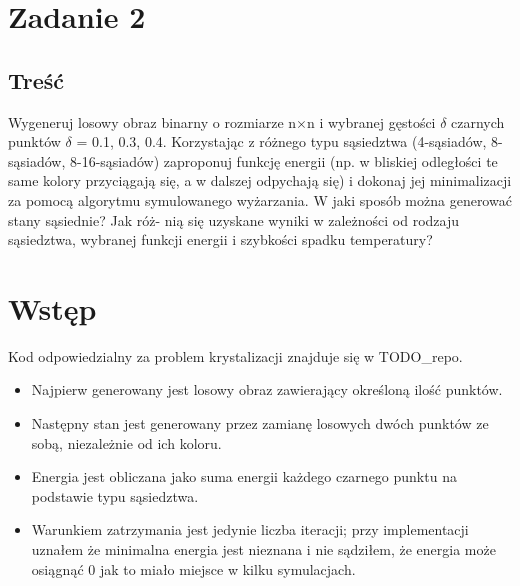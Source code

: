\section{Zadanie 2}
\subsection{Treść} 
Wygeneruj losowy obraz binarny o rozmiarze n$\times$n i wybranej gęstości $\delta$ czarnych punktów
$\delta$ = 0.1, 0.3, 0.4. Korzystając z różnego typu sąsiedztwa (4-sąsiadów, 8-sąsiadów,
8-16-sąsiadów) zaproponuj funkcję energii (np. w bliskiej odległości te same kolory przyciągają
się, a w dalszej odpychają się) i dokonaj jej minimalizacji za pomocą algorytmu
symulowanego wyżarzania. W jaki sposób można generować stany sąsiednie? Jak róż-
nią się uzyskane wyniki w zależności od rodzaju sąsiedztwa, wybranej funkcji energii i
szybkości spadku temperatury?
\section{Wstęp}
Kod odpowiedzialny za problem krystalizacji znajduje się w TODO\_repo.
\begin{itemize}
\item Najpierw generowany jest losowy obraz zawierający określoną ilość punktów.
\item Następny stan jest generowany przez zamianę losowych dwóch punktów ze sobą, niezależnie od ich koloru.
\item Energia jest obliczana jako suma energii każdego czarnego punktu na podstawie typu sąsiedztwa.
\item Warunkiem zatrzymania jest jedynie liczba iteracji; przy implementacji uznałem że minimalna energia jest nieznana i nie sądziłem, że energia może osiągnąć 0 jak to miało miejsce w kilku symulacjach.
\end{itemize}

